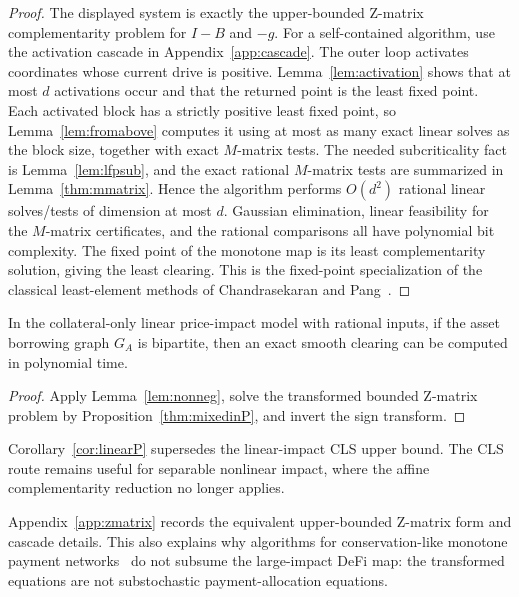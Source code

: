 \documentclass{llncs}
\newcommand{\GA}{G_A}
\begin{document}
\begin{proof}
The displayed system is exactly the upper-bounded Z-matrix complementarity problem for \(I-B\) and \(-g\). For a self-contained algorithm, use the activation cascade in Appendix~\ref{app:cascade}. The outer loop activates coordinates whose current drive is positive. Lemma~\ref{lem:activation} shows that at most \(d\) activations occur and that the returned point is the least fixed point. Each activated block has a strictly positive least fixed point, so Lemma~\ref{lem:fromabove} computes it using at most as many exact linear solves as the block size, together with exact \(M\)-matrix tests. The needed subcriticality fact is Lemma~\ref{lem:lfpsub}, and the exact rational \(M\)-matrix tests are summarized in Lemma~\ref{thm:mmatrix}. Hence the algorithm performs \(O(d^2)\) rational linear solves/tests of dimension at most \(d\). Gaussian elimination, linear feasibility for the \(M\)-matrix certificates, and the rational comparisons all have polynomial bit complexity. The fixed point of the monotone map is its least complementarity solution, giving the least clearing. This is the fixed-point specialization of the classical least-element methods of Chandrasekaran and Pang~\cite{Chandrasekaran1970,Pang1979}.
\end{proof}

\begin{corollary}
\label{cor:linearP}
In the collateral-only linear price-impact model with rational inputs, if the asset borrowing graph \(\GA\) is bipartite, then an exact smooth clearing can be computed in polynomial time.
\end{corollary}

\begin{proof}
Apply Lemma~\ref{lem:nonneg}, solve the transformed bounded Z-matrix problem by Proposition~\ref{thm:mixedinP}, and invert the sign transform.
\end{proof}

\begin{remark}
\label{rem:mixedsign}
Corollary~\ref{cor:linearP} supersedes the linear-impact CLS upper bound. The CLS route remains useful for separable nonlinear impact, where the affine complementarity reduction no longer applies.
\end{remark}

Appendix~\ref{app:zmatrix} records the equivalent upper-bounded Z-matrix form and cascade details. This also explains why algorithms for conservation-like monotone payment networks~\cite{BestingHoeferHuth2026} do not subsume the large-impact DeFi map: the transformed equations are not substochastic payment-allocation equations.
\end{document}
